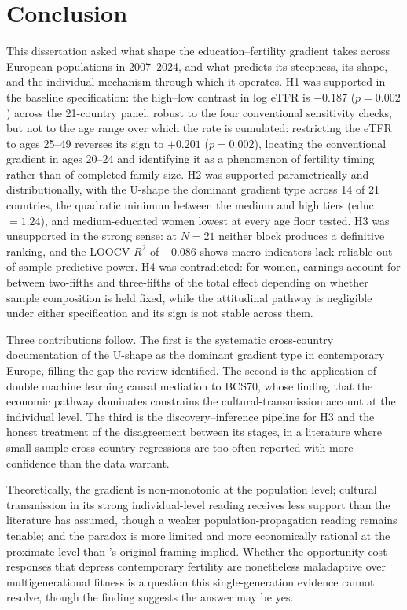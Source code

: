 \documentclass[12pt,a4paper]{report}
\begin{document}
\chapter{Conclusion}

This dissertation asked what shape the education--fertility gradient takes across European populations
in 2007--2024, and what predicts its steepness, its shape, and the individual mechanism through which it
operates. H1 was supported in the baseline specification: the high--low contrast
in log eTFR is $-0.187$ ($p=0.002$) across the 21-country panel, robust to the four conventional
sensitivity checks, but not to the age range over which the rate is cumulated:
restricting the eTFR to ages 25--49 reverses its sign to $+0.201$ ($p=0.002$), locating the
conventional gradient in ages 20--24 and identifying it as a phenomenon of fertility timing rather
than of completed family size. H2 was supported
parametrically and distributionally, with the U-shape the dominant gradient type across 14 of 21
countries, the quadratic minimum between the medium and high tiers (educ $=1.24$), and
medium-educated women lowest at every age floor tested. H3 was unsupported
in the strong sense: at $N=21$ neither block produces a definitive ranking, and the LOOCV $R^2$ of
$-0.086$ shows macro indicators lack reliable out-of-sample predictive power. H4 was contradicted: for
women, earnings account for between two-fifths and three-fifths of the
total effect depending on whether sample composition is held fixed, while the attitudinal pathway is
negligible under either specification and its sign is not stable across them.

Three contributions follow. The first is the systematic cross-country documentation of the U-shape as
the dominant gradient type in contemporary Europe, filling the gap the \citet{stulpbarrett2016} review
identified. The second is the application of double machine learning causal mediation to BCS70, whose
finding that the economic pathway dominates constrains the cultural-transmission account at the
individual level. The third is the discovery--inference pipeline for H3 and the honest treatment of the
disagreement between its stages, in a literature where small-sample cross-country regressions are too
often reported with more confidence than the data warrant.

Theoretically, the gradient is non-monotonic at the population level; cultural transmission
in its strong individual-level reading receives less support than the literature has assumed, though a
weaker population-propagation reading remains tenable; and the paradox is more limited and more
economically rational at the proximate level than \citet{vining1986}'s original framing implied. Whether
the opportunity-cost responses that depress contemporary fertility are nonetheless maladaptive
over multigenerational fitness is a question this single-generation evidence cannot resolve, though the
\citet{goodman2012} finding suggests the answer may be yes.
\end{document}
